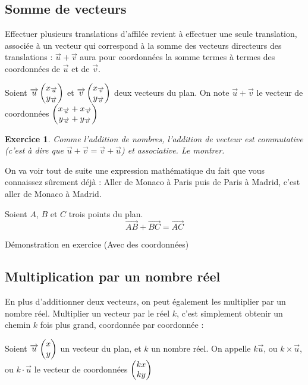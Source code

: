 \documentclass[10pt,a4paper,oneside]{book}
\newtheorem{exo}{Exercice}
\begin{document}
\subsection{Somme de vecteurs}

Effectuer plusieurs translations d'affilée revient à effectuer une seule translation, associée à un vecteur qui correspond à la somme des vecteurs directeurs des translations : $\overrightarrow{u}+\overrightarrow{v}$ aura pour coordonnées la somme termes à termes des coordonnées de $\overrightarrow{u}$ et de $\overrightarrow{v}$.

\begin{de}
    Soient $\overrightarrow{u}  \begin{pmatrix} x_{\overrightarrow{u}}\\ y_{\overrightarrow{u}} \end{pmatrix}$ et 
    $\overrightarrow{v}  \begin{pmatrix} x_{\overrightarrow{v}}\\ y_{\overrightarrow{v}} \end{pmatrix}$ deux vecteurs du plan. 
    On note $\overrightarrow{u}+\overrightarrow{v}$ le vecteur de coordonnées 
    $ \begin{pmatrix} x_{\overrightarrow{u}}+x_{\overrightarrow{v}}\\ y_{\overrightarrow{u}}+y_{\overrightarrow{v}} \end{pmatrix}$
\end{de}

\begin{exo}
  Comme l'addition de nombres, l'addition de vecteur est commutative (c'est à dire que $\overrightarrow{u}+\overrightarrow{v} = \overrightarrow{v}+\overrightarrow{u}$) et associative. Le montrer.
\end{exo}

On va voir tout de suite une expression mathématique du fait que vous connaissez sûrement déjà : Aller de Monaco à Paris puis de Paris à Madrid, c'est aller de Monaco à Madrid.

\begin{prop}
  Soient $A$, $B$ et $C$ trois points du plan. 
  \[ \overrightarrow{AB} + \overrightarrow{BC} = \overrightarrow{AC}\]
\end{prop}

Démonstration en exercice (Avec des coordonnées)

\subsection{Multiplication par un nombre réel}

En plus d'additionner deux vecteurs, on peut également les multiplier par un nombre réel. Multiplier un vecteur par le réel $k$, c'est simplement obtenir un chemin $k$ fois plus grand, coordonnée par coordonnée :

\begin{de}
  Soient $\overrightarrow{u}  \begin{pmatrix} x\\ y \end{pmatrix}$ un vecteur du plan, et $k$ un nombre réel. On appelle $k \overrightarrow{u}$, ou $k \times \overrightarrow{u}$, ou $k \cdot \overrightarrow{u}$ le vecteur de coordonnées $ \begin{pmatrix} kx\\ ky \end{pmatrix}$  
\end{de}
\end{document}

